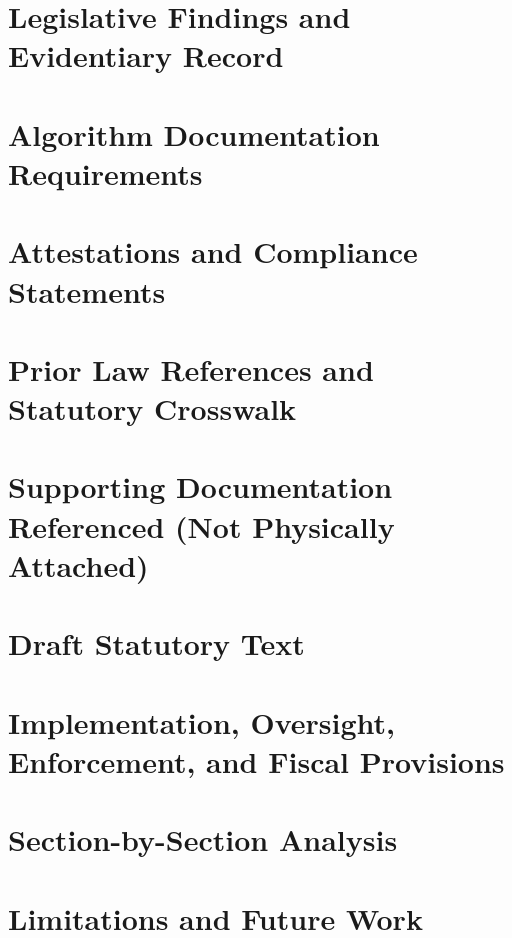 \documentclass[11pt]{article}
\begin{document}
\section{Legislative Findings and Evidentiary Record}
\label{sec:findings}


\section{Algorithm Documentation Requirements}
\label{sec:algorithm_documentation}


\section{Attestations and Compliance Statements}
\label{sec:attestations_compliance}


\section{Prior Law References and Statutory Crosswalk}
\label{sec:prior_law}


\section{Supporting Documentation Referenced (Not Physically Attached)}
\label{sec:supporting_documentation}


\section{Draft Statutory Text}
\label{sec:statutory_text}


\section{Implementation, Oversight, Enforcement, and Fiscal Provisions}
\label{sec:implementation_enforcement}


\section{Section-by-Section Analysis}
\label{sec:section_by_section}


\section{Limitations and Future Work}
\label{sec:limitations}

\end{document}
